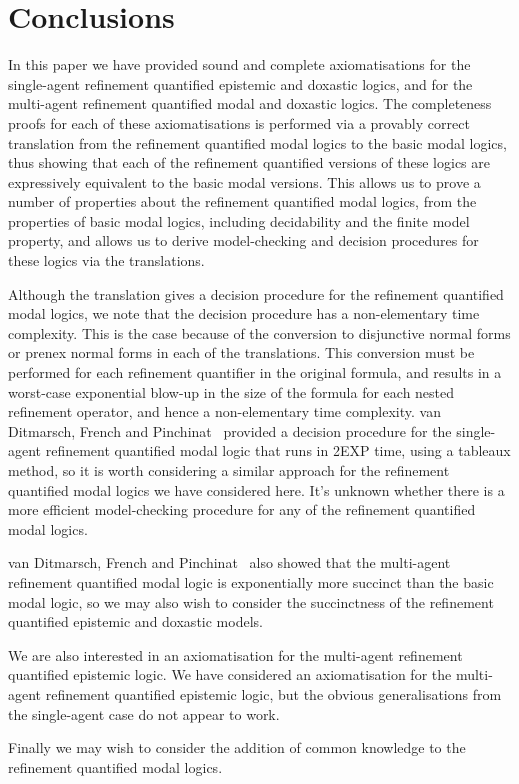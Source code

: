 \chapter{Conclusions}

In this paper we have provided sound and complete axiomatisations for the
single-agent refinement quantified epistemic and doxastic logics, and for the
multi-agent refinement quantified modal and doxastic logics. The completeness
proofs for each of these axiomatisations is performed via a provably correct
translation from the refinement quantified modal logics to the basic modal
logics, thus showing that each of the refinement quantified versions of these
logics are expressively equivalent to the basic modal versions. This allows us
to prove a number of properties about the refinement quantified modal logics,
from the properties of basic modal logics, including decidability and the finite
model property, and allows us to derive model-checking and decision procedures
for these logics via the translations.

Although the translation gives a decision procedure for the refinement
quantified modal logics, we note that the decision procedure has a
non-elementary time complexity. This is the case because of the conversion to
disjunctive normal forms or prenex normal forms in each of the translations.
This conversion must be performed for each refinement quantifier in the original
formula, and results in a worst-case exponential blow-up in the size of the
formula for each nested refinement operator, and hence a non-elementary time
complexity. van Ditmarsch, French and Pinchinat~\cite{french2010future} provided
a decision procedure for the single-agent refinement quantified modal logic that
runs in 2EXP time, using a tableaux method, so it is worth considering a similar
approach for the refinement quantified modal logics we have considered here.
It's unknown whether there is a more efficient model-checking procedure for any
of the refinement quantified modal logics.

van Ditmarsch, French and Pinchinat~\cite{french2010future} also showed
that the multi-agent refinement quantified modal logic is exponentially more
succinct than the basic modal logic, so we may also wish to consider the
succinctness of the refinement quantified epistemic and doxastic models.

We are also interested in an axiomatisation for the multi-agent refinement
quantified epistemic logic. We have considered an axiomatisation for the
multi-agent refinement quantified epistemic logic, but the obvious
generalisations from the single-agent case do not appear to work.

Finally we may wish to consider the addition of common knowledge to the
refinement quantified modal logics.
